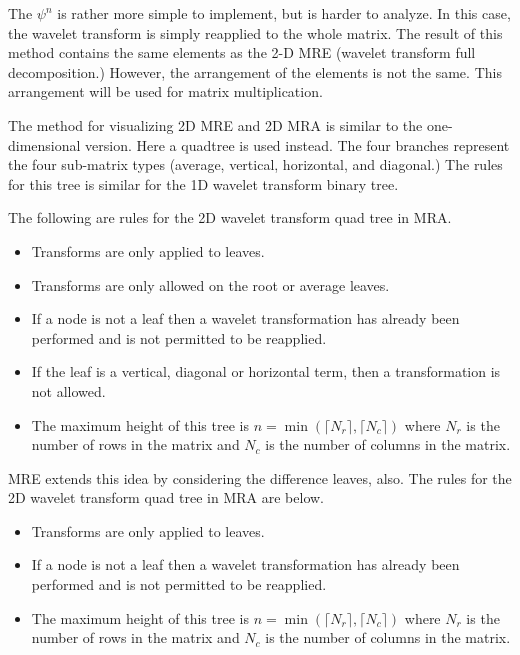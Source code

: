 The $\psi^n$ is rather more simple to implement, but is harder to
analyze.  In this case, the wavelet transform is simply reapplied to
the whole matrix.  The result of this method contains the same
elements as the 2-D MRE (wavelet transform full decomposition.)
However, the arrangement of the elements is not the same.  This
arrangement will be used for matrix multiplication.

The method for visualizing 2D MRE and 2D MRA is similar to the
one-dimensional version.  Here a quadtree is used instead.  The four
branches represent the four sub-matrix types (average, vertical,
horizontal, and diagonal.)  The rules for this tree is similar for the
1D wavelet transform binary tree.

The following are rules for the 2D wavelet transform quad tree in MRA.
\begin{itemize}
\item Transforms are only applied to leaves.
\item Transforms are only allowed on the root or average leaves.
\item If a node is not a leaf then a wavelet transformation has already been performed and is not permitted to be reapplied.
\item If the leaf is a vertical, diagonal or horizontal term, then a transformation is not allowed.
\item The maximum height of this tree is 
$n = \min \left( \lceil N_r \rceil, \lceil N_c \rceil \right)$
where $N_r$ is the number of rows in the matrix and $N_c$ is the number of columns in the matrix.
\end{itemize}   

MRE extends this idea by considering the difference leaves, also.  The rules for the 2D wavelet transform quad tree in MRA are below.
\begin{itemize}
\item Transforms are only applied to leaves.
\item If a node is not a leaf then a wavelet transformation has already been performed and is not permitted to be reapplied.
\item The maximum height of this tree is 
$n = \min \left( \lceil N_r \rceil, \lceil N_c \rceil \right)$
where $N_r$ is the number of rows in the matrix and $N_c$ is the number of columns in the matrix.
\end{itemize}   



